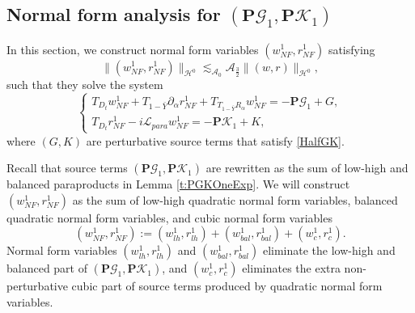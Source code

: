 \documentclass[10pt]{amsart}
\theoremstyle{remark}
\theoremstyle{definition}
\numberwithin{equation}{section}
\newcommand{\p}{\partial}
\renewcommand{\H}{{\mathcal H }}
\newcommand{\al}{\alpha}
\newcommand{\f}{\frac}
\newcommand{\nP}{{\mathbf P}}
\newcommand{\CalAZ}{{\mathcal{A}_0}}
\begin{document}
\subsection{Normal form analysis for $(\nP\mathcal{G}_1, \nP\mathcal{K}_1)$} \label{s:NormalOne}
In this section, we construct normal form variables $(w_{NF}^1, r_{NF}^1)$ satisfying
\begin{equation} \label{wrNFHOneBound}
    \|(w_{NF}^1, r_{NF}^1)\|_{\H^0} \lesssim_\CalAZ \mathcal{A}_{\f32} \|(w,r)\|_{\H^0},
\end{equation}
such that they solve the system
\begin{equation}  \label{wOneNFPGKOne}
\begin{cases}
T_{D_t}w_{NF}^1+T_{1-\bar{Y}}\p_\al r_{NF}^1+T_{T_{1-\bar{Y}}R_{\al}}w_{NF}^1= -\nP \mathcal{G}_1 + G,\\
T_{D_t}r_{NF}^1-i\mathcal{L}_{para}w_{NF}^1=- \nP \mathcal{K}_1 +K,
\end{cases}
\end{equation}
where $(G,K)$ are perturbative source terms that satisfy \eqref{HalfGK}.

Recall that source terms $(\nP\mathcal{G}_1, \nP\mathcal{K}_1)$ are rewritten as the sum of low-high and balanced paraproducts in Lemma \ref{t:PGKOneExp}.
We will construct $(w_{NF}^1, r_{NF}^1)$ as the sum of low-high quadratic normal form variables, balanced quadratic normal form variables, and cubic normal form variables
\begin{equation} \label{wrNFOneDef}
 (w_{NF}^1, r_{NF}^1) := (w^1_{lh}, r^1_{lh}) + (w_{bal}^1, r_{bal}^1) + (w^1_c, r^1_{c}).   
\end{equation}
Normal form variables $(w^1_{lh}, r^1_{lh})$ and $(w_{bal}^1, r_{bal}^1)$ eliminate the low-high and balanced part of $(\nP\mathcal{G}_1, \nP\mathcal{K}_1)$, and $(w^1_c, r^1_{c})$ eliminates the extra non-perturbative cubic part of source terms produced by quadratic normal form variables.
\end{document}
